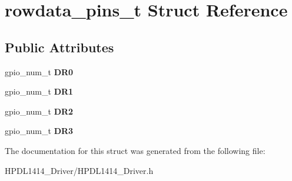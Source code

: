 \hypertarget{structrowdata__pins__t}{}\section{rowdata\+\_\+pins\+\_\+t Struct Reference}
\label{structrowdata__pins__t}
\subsection*{Public Attributes}
\begin{DoxyCompactItemize}
\item 
\mbox{\label{structrowdata__pins__t_af5485c290589f120ec80f689cc22f44a}} 
gpio\+\_\+num\+\_\+t {\bfseries D\+R0}
\item 
\mbox{\label{structrowdata__pins__t_a7591dde9f2e804de8006a2f2f9b55bf3}} 
gpio\+\_\+num\+\_\+t {\bfseries D\+R1}
\item 
\mbox{\label{structrowdata__pins__t_a586a65c00df4a7a0b9a315cf6d5b0b34}} 
gpio\+\_\+num\+\_\+t {\bfseries D\+R2}
\item 
\mbox{\label{structrowdata__pins__t_ad5b7edb19f02df23e152d93cfdcdc2dc}} 
gpio\+\_\+num\+\_\+t {\bfseries D\+R3}
\end{DoxyCompactItemize}


The documentation for this struct was generated from the following file\+:\begin{DoxyCompactItemize}
\item 
H\+P\+D\+L1414\+\_\+\+Driver/H\+P\+D\+L1414\+\_\+\+Driver.\+h\end{DoxyCompactItemize}
